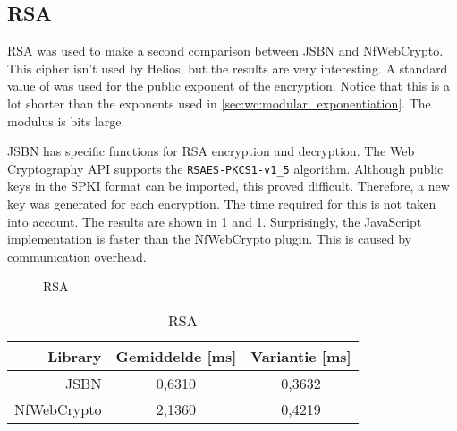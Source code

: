 \subsection{RSA}

RSA was used to make a second comparison between JSBN and NfWebCrypto. This cipher isn't used by Helios, but the results are very interesting. A standard value of  was used for the public exponent of the encryption. Notice that this is a lot shorter than the exponents used in \ref{sec:wc:modular_exponentiation}. The modulus is  bits large.

\par JSBN has specific functions for RSA encryption and decryption. The Web Cryptography API supports the \texttt{RSAES-PKCS1-v1\_5} algorithm.\cite{rfc3447} Although public keys in the SPKI format can be imported, this proved difficult. Therefore, a new key was generated for each encryption. The time required for this is not taken into account. The results are shown in \ref{fig:wc:rsa} and \ref{tab:wc:rsa}. Surprisingly, the JavaScript implementation is faster than the NfWebCrypto plugin. This is caused by communication overhead.

\begin{figure}
  \caption{RSA}
  \label{fig:wc:rsa}
\end{figure}

\begin{table}
  \begin{center}
    \caption{RSA}
    \label{tab:wc:rsa}
    \begin{tabular}{r | c c}
      Library & Gemiddelde [ms] & Variantie [ms] \\ \hline
      JSBN & 0,6310 & 0,3632  \\
      NfWebCrypto & 2,1360 & 0,4219
    \end{tabular}
  \end{center}
\end{table}
